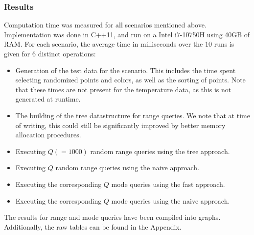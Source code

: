 \documentclass{article}
\begin{document}
\subsubsection*{Results}
Computation time was measured for all scenarios mentioned above. Implementation was done in C++11, and run on a Intel i7-10750H using 40GB of RAM. For each scenario, the average time in milliseconds over the 10 runs is given for 6 distinct operations:
\begin{itemize}
    \item Generation of the test data for the scenario. This includes the time spent
          selecting randomized points and colors, as well as the sorting of points. Note
          that these times are not present for the temperature data, as this is not
          generated at runtime.
    \item The building of the tree datastructure for range queries. We note that at time
          of writing, this could still be significantly improved by better memory
          allocation procedures.
    \item Executing $Q (= 1000)$ random range queries using the tree approach.
    \item Executing $Q$ random range queries using the naive approach.
    \item Executing the corresponding $Q$ mode queries using the fast approach.
    \item Executing the corresponding $Q$ mode queries using the naive approach.
\end{itemize}
The results for range and mode queries have been compiled into graphs. Additionally, the raw tables can be found in the Appendix.\\


\end{document}

